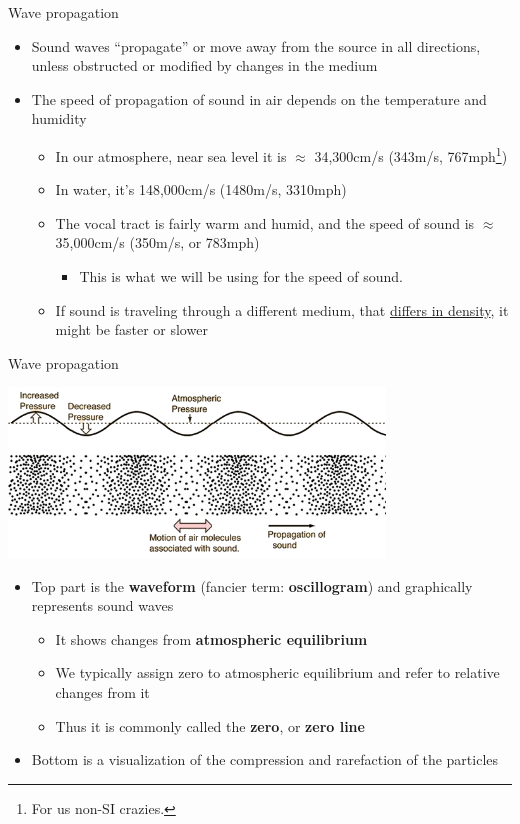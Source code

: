 \documentclass[professionalfonts]{beamer}
\begin{document}
\begin{frame}{Wave propagation}
    \begin{itemize}
        \item Sound waves “propagate” or move away from the source in all directions, unless obstructed or modified by changes in the medium
        \item The speed of propagation of sound in air depends on the temperature and humidity
        \begin{itemize}
            \item In our atmosphere, near sea level it is $\approx$ 34,300cm/s (343m/s, 767mph\footnote{For us non-SI crazies.})
            \item In water, it's 148,000cm/s (1480m/s, 3310mph)
            \item The vocal tract is fairly warm and humid, and the speed of sound is $\approx $35,000cm/s (350m/s, or 783mph)
            \begin{itemize}
                \item This is what we will be using for the speed of sound. 
            \end{itemize}
            \item If sound is traveling through a different medium, that \href{https://youtu.be/d-XbjFn3aqE?si=3AE-7EA5ck7BWhJa}{differs in density}, it might be faster or slower 
        \end{itemize}
    \end{itemize}
\end{frame}

\begin{frame}{Wave propagation}
    \begin{center}
        \includegraphics[width = 0.75\textwidth]{figs/OscillogramPressure.png}
    \end{center}
    \begin{itemize}
        \item Top part is the \textbf{waveform} (fancier term: \textbf{oscillogram}) and graphically represents sound waves
        \begin{itemize}
            \item It shows changes from \textbf{atmospheric equilibrium} 
            \item We typically assign zero to atmospheric equilibrium and refer to relative changes from it 
            \item Thus it is commonly called the \textbf{zero}, or \textbf{zero line}
        \end{itemize}
        \item Bottom is a visualization of the compression and rarefaction of the particles
    \end{itemize}
\end{frame}
\end{document}
